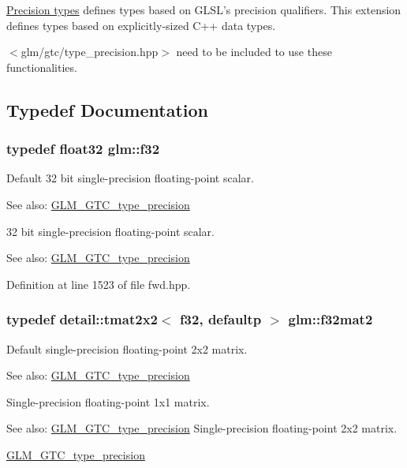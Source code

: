 \hyperlink{group__core__precision}{Precision types} defines types based on GLSL's precision qualifiers. This extension defines types based on explicitly-sized C++ data types.

$<$glm/gtc/type\_\-precision.hpp$>$ need to be included to use these functionalities. 

\subsection{Typedef Documentation}
\hypertarget{group__gtc__type__precision_g0ec999b57f5330d9021256e96038df04}{
\subsubsection[f32]{\setlength{\rightskip}{0pt plus 5cm}typedef float32 {\bf glm::f32}}}
\label{group__gtc__type__precision_g0ec999b57f5330d9021256e96038df04}


Default 32 bit single-precision floating-point scalar. \begin{Desc}
\item[See also:]\hyperlink{group__gtc__type__precision}{GLM\_\-GTC\_\-type\_\-precision}\end{Desc}
32 bit single-precision floating-point scalar. \begin{Desc}
\item[See also:]\hyperlink{group__gtc__type__precision}{GLM\_\-GTC\_\-type\_\-precision} \end{Desc}


Definition at line 1523 of file fwd.hpp.\hypertarget{group__gtc__type__precision_g5a8b82f5ef3eb6355640d57466793d9b}{
\subsubsection[f32mat2]{\setlength{\rightskip}{0pt plus 5cm}typedef detail::tmat2x2$<$ f32, defaultp $>$ {\bf glm::f32mat2}}}
\label{group__gtc__type__precision_g5a8b82f5ef3eb6355640d57466793d9b}


Default single-precision floating-point 2x2 matrix. \begin{Desc}
\item[See also:]\hyperlink{group__gtc__type__precision}{GLM\_\-GTC\_\-type\_\-precision}\end{Desc}
Single-precision floating-point 1x1 matrix. \begin{Desc}
\item[See also:]\hyperlink{group__gtc__type__precision}{GLM\_\-GTC\_\-type\_\-precision} Single-precision floating-point 2x2 matrix. 

\hyperlink{group__gtc__type__precision}{GLM\_\-GTC\_\-type\_\-precision} \end{Desc}


